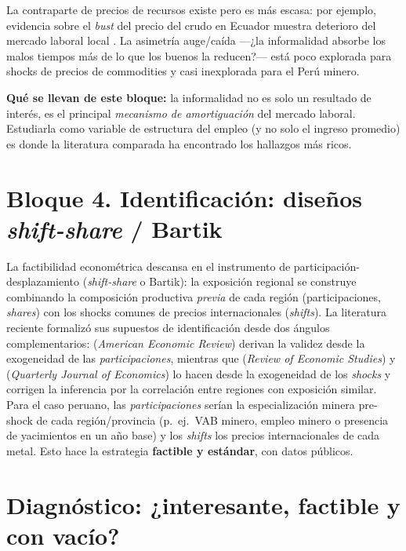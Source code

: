 \documentclass[11pt]{article}
\begin{document}
La contraparte de precios de recursos existe pero es más escasa: por ejemplo, evidencia sobre
el \emph{bust} del precio del crudo en Ecuador muestra deterioro del mercado laboral local
\citep{idb_ecuador}. La asimetría auge/caída —¿la informalidad absorbe los malos tiempos
más de lo que los buenos la reducen?— está poco explorada para shocks de precios de
commodities y casi inexplorada para el Perú minero.

\medskip
\noindent\textbf{Qué se llevan de este bloque:} la informalidad no es solo un resultado de
interés, es el principal \emph{mecanismo de amortiguación} del mercado laboral. Estudiarla
como variable de estructura del empleo (y no solo el ingreso promedio) es donde la literatura
comparada ha encontrado los hallazgos más ricos.

\section{Bloque 4. Identificación: diseños \textit{shift-share} / Bartik}

La factibilidad econométrica descansa en el instrumento de participación-desplazamiento
(\textit{shift-share} o Bartik): la exposición regional se construye combinando la
composición productiva \emph{previa} de cada región (participaciones, \textit{shares}) con los
shocks comunes de precios internacionales (\textit{shifts}). La literatura reciente formalizó
sus supuestos de identificación desde dos ángulos complementarios:
\citet{goldsmith2020} (\textit{American Economic Review}) derivan la validez desde la
exogeneidad de las \emph{participaciones}, mientras que \citet{borusyak2022}
(\textit{Review of Economic Studies}) y \citet{adao2019} (\textit{Quarterly Journal of
Economics}) lo hacen desde la exogeneidad de los \emph{shocks} y corrigen la inferencia por la
correlación entre regiones con exposición similar. Para el caso peruano, las
\emph{participaciones} serían la especialización minera pre-shock de cada región/provincia
(p.\ ej.\ VAB minero, empleo minero o presencia de yacimientos en un año base) y los
\emph{shifts} los precios internacionales de cada metal. Esto hace la estrategia
\textbf{factible y estándar}, con datos públicos.

\section{Diagnóstico: ¿interesante, factible y con vacío?}
\end{document}
